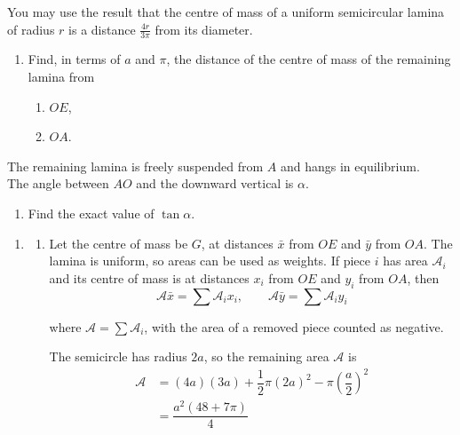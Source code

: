 \documentclass[leqno]{article}
\begin{document}
\begin{enumerate}[
  label=\textbf{\arabic*.},
  leftmargin=*,
  topsep=0pt,
  partopsep=0pt,
  parsep=0pt
]
You may use the result that the centre of mass of a uniform semicircular lamina of radius $r$ is a distance $\frac{4r}{3\pi}$ from its diameter. \\
\begin{enumerate}[label=\textbf{(\alph*)}]
\item Find, in terms of $a$ and $\pi$, the distance of the centre of mass of the remaining lamina from
\begin{enumerate}[label=(\roman*)]
\item $OE$,
\item $OA$.
\end{enumerate}
\end{enumerate}
The remaining lamina is freely suspended from $A$ and hangs in equilibrium. \\
The angle between $AO$ and the downward vertical is $\alpha$. \\
\begin{enumerate}[label=\textbf{(\alph*)}, resume]
\item Find the exact value of $\tan\alpha$.  \\
\end{enumerate}

\vspace*{10pt}

\begin{djsSolution}
\begin{enumerate}[label=\textbf{(\alph*)}, start=1]
\item
\begin{enumerate}[label=(\roman*), start=1]
\item Let the centre of mass be \(G\), at distances \(\bar{x}\) from \(OE\) and \(\bar{y}\) from \(OA\). The lamina is uniform, so areas can be used as weights. If piece \(i\) has area \(\mathcal{A}_i\) and its centre of mass is at distances \(x_i\) from \(OE\) and \(y_i\) from \(OA\), then
\[
\mathcal{A}\bar{x}=\sum\mathcal{A}_ix_i,\qquad \mathcal{A}\bar{y}=\sum\mathcal{A}_iy_i
\]

where \(\mathcal{A}=\sum\mathcal{A}_i\), with the area of a removed piece counted as negative.

The semicircle has radius \(2a\), so the remaining area \(\mathcal{A}\) is
\begin{align*}
\mathcal{A}&=(4a)(3a)+\dfrac12\pi(2a)^2-\pi\left(\dfrac a2\right)^2\\
&=\dfrac{a^2(48+7\pi)}4
\end{align*}


\end{enumerate}
\end{enumerate}
\end{djsSolution}
\end{enumerate}
\end{document}
